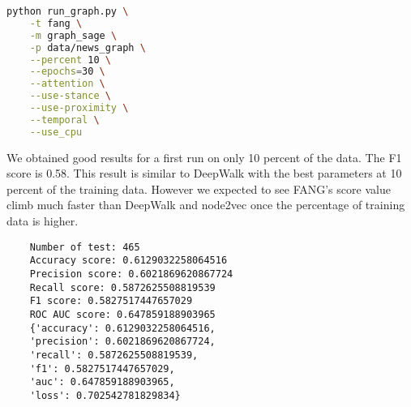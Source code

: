 \begin{lstlisting}[language=bash]
python run_graph.py \
    -t fang \
    -m graph_sage \
    -p data/news_graph \
    --percent 10 \
    --epochs=30 \
    --attention \
    --use-stance \
    --use-proximity \
    --temporal \
    --use_cpu
\end{lstlisting}

We obtained good results for a first run on only 10 percent of the data.
The F1 score is 0.58.
This result is similar to DeepWalk with the best parameters at 10 percent of the training data. 
However we expected to see FANG's score value climb much faster than DeepWalk and node2vec once the percentage of training data is higher.

\begin{lstlisting}
    Number of test: 465
    Accuracy score: 0.6129032258064516
    Precision score: 0.6021869620867724
    Recall score: 0.5872625508819539
    F1 score: 0.5827517447657029
    ROC AUC score: 0.647859188903965
    {'accuracy': 0.6129032258064516, 
    'precision': 0.6021869620867724, 
    'recall': 0.5872625508819539, 
    'f1': 0.5827517447657029, 
    'auc': 0.647859188903965, 
    'loss': 0.702542781829834}
\end{lstlisting}

\newpage
